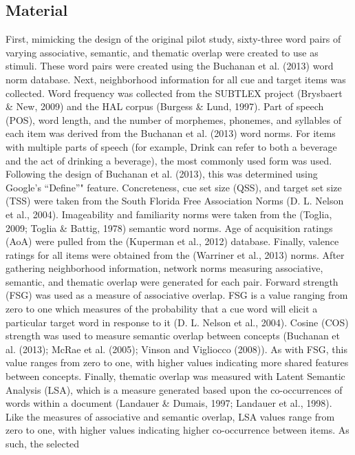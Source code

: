 \documentclass[english,man]{apa6}
\theoremstyle{definition}
\theoremstyle{definition}
\theoremstyle{definition}
\theoremstyle{remark}
\begin{document}
\subsection{Material}\label{material}

First, mimicking the design of the original pilot study, sixty-three
word pairs of varying associative, semantic, and thematic overlap were
created to use as stimuli. These word pairs were created using the
Buchanan et al. (2013) word norm database. Next, neighborhood
information for all cue and target items was collected. Word frequency
was collected from the SUBTLEX project (Brysbaert \& New, 2009) and the
HAL corpus (Burgess \& Lund, 1997). Part of speech (POS), word length,
and the number of morphemes, phonemes, and syllables of each item was
derived from the Buchanan et al. (2013) word norms. For items with
multiple parts of speech (for example, Drink can refer to both a
beverage and the act of drinking a beverage), the most commonly used
form was used. Following the design of Buchanan et al. (2013), this was
determined using Google's \enquote{Define}" feature. Concreteness, cue
set size (QSS), and target set size (TSS) were taken from the South
Florida Free Association Norms (D. L. Nelson et al., 2004). Imageability
and familiarity norms were taken from the (Toglia, 2009; Toglia \&
Battig, 1978) semantic word norms. Age of acquisition ratings (AoA) were
pulled from the (Kuperman et al., 2012) database. Finally, valence
ratings for all items were obtained from the (Warriner et al., 2013)
norms. After gathering neighborhood information, network norms measuring
associative, semantic, and thematic overlap were generated for each
pair. Forward strength (FSG) was used as a measure of associative
overlap. FSG is a value ranging from zero to one which measures of the
probability that a cue word will elicit a particular target word in
response to it (D. L. Nelson et al., 2004). Cosine (COS) strength was
used to measure semantic overlap between concepts (Buchanan et al.
(2013); McRae et al. (2005); Vinson and Vigliocco (2008)). As with FSG,
this value ranges from zero to one, with higher values indicating more
shared features between concepts. Finally, thematic overlap was measured
with Latent Semantic Analysis (LSA), which is a measure generated based
upon the co-occurrences of words within a document (Landauer \& Dumais,
1997; Landauer et al., 1998). Like the measures of associative and
semantic overlap, LSA values range from zero to one, with higher values
indicating higher co-occurrence between items. As such, the selected
\end{document}

